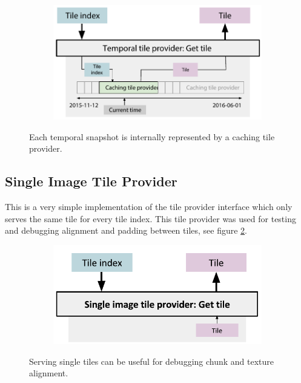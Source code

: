 \begin{figure}[htbp]
    \centering
    \begin{subfigure}[bt]{0.7\textwidth}
        \includegraphics[width=\textwidth]{figures/implementation/tileprovider/temporaltileprovider_gettile.pdf}
    \end{subfigure}
    \caption{Each temporal snapshot is internally represented by a caching tile provider.}
    \label{fig:temporaltileprovider_gettile}
\end{figure}


\subsection{Single Image Tile Provider}
This is a very simple implementation of the tile provider interface which only serves the same tile for every tile index. This tile provider was used for testing and debugging alignment and padding between tiles, see figure \ref{fig:singleimagetileprovider_gettile}.

\begin{figure}[htbp]
    \centering
    \begin{subfigure}[bt]{0.5\textwidth}
        \includegraphics[width=\textwidth]{figures/implementation/tileprovider/singleimagetileprovider_gettile.pdf}
    \end{subfigure}
    \caption{Serving single tiles can be useful for debugging chunk and texture alignment.}
    \label{fig:singleimagetileprovider_gettile}
\end{figure}

